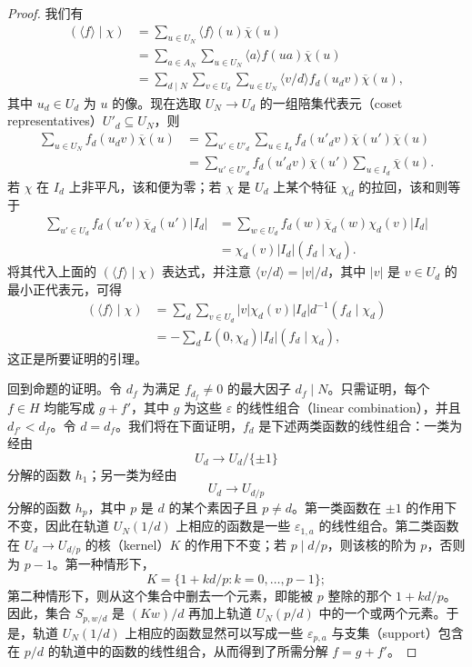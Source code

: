 \begin{proof}
我们有
\begin{align*}
 (\langle f\rangle\mid\chi)
 &=\sum_{u\in U_N}\langle f\rangle(u)\overline{\chi}(u)\\
 &=\sum_{a\in A_N}\sum_{u\in U_N}\langle a\rangle f(ua)\overline{\chi}(u)\\
 &=\sum_{d\mid N}\sum_{v\in U_d}\sum_{u\in U_N}
   \langle v/d\rangle f_d(u_dv)\overline{\chi}(u),
\end{align*}
其中 $u_d\in U_d$ 为 $u$ 的像。现在选取 $U_N\longrightarrow U_d$ 的一组陪集代表元（coset representatives）$U'_d\subseteq U_N$，则
\begin{align*}
 \sum_{u\in U_N}f_d(u_dv)\overline\chi(u)
 &=\sum_{u'\in U'_d}\sum_{u\in I_d}
       f_d(u'_dv)\overline\chi(u')\overline\chi(u)\\
 &=\sum_{u'\in U'_d}f_d(u'_dv)\overline\chi(u')
       \sum_{u\in I_d}\overline\chi(u).
\end{align*}
若 $\chi$ 在 $I_d$ 上非平凡，该和便为零；若 $\chi$ 是 $U_d$ 上某个特征 $\chi_d$ 的拉回，该和则等于
\begin{align*}
 \sum_{u'\in U_d}f_d(u'v)\overline\chi_d(u')|I_d|
 &=\sum_{w\in U_d}f_d(w)\overline\chi_d(w)\chi_d(v)|I_d|\\
 &=\chi_d(v)|I_d|(f_d\mid\chi_d).
\end{align*}
将其代入上面的 $(\langle f\rangle\mid\chi)$ 表达式，并注意
$\langle v/d\rangle=|v|/d$，其中 $|v|$ 是 $v\in U_d$ 的最小正代表元，可得
\begin{align*}
 (\langle f\rangle\mid\chi)
 &=\sum_d\sum_{v\in U_d}|v|\chi_d(v)|I_d|d^{-1}(f_d\mid\chi_d)\\
 &=-\sum_d L(0,\chi_d)|I_d|(f_d\mid\chi_d),
\end{align*}
这正是所要证明的引理。

回到命题的证明。令 $d_f$ 为满足 $f_{d_f}\ne0$ 的最大因子 $d_f\mid N$。只需证明，每个 $f\in H$ 均能写成 $g+f'$，其中 $g$ 为这些 $\varepsilon$ 的线性组合（linear combination），并且 $d_{f'}<d_f$。令 $d=d_f$。我们将在下面证明，$f_d$ 是下述两类函数的线性组合：一类为经由
\[
 U_d\longrightarrow U_d/\{\pm1\}
\]
分解的函数 $h_1$；另一类为经由
\[
 U_d\longrightarrow U_{d/p}
\]
分解的函数 $h_p$，其中 $p$ 是 $d$ 的某个素因子且 $p\ne d$。第一类函数在 $\pm1$ 的作用下不变，因此在轨道 $U_N(1/d)$ 上相应的函数是一些 $\varepsilon_{1,a}$ 的线性组合。第二类函数在 $U_d\longrightarrow U_{d/p}$ 的核（kernel）$K$ 的作用下不变；若 $p\mid d/p$，则该核的阶为 $p$，否则为 $p-1$。第一种情形下，
\[
 K=\{1+kd/p:k=0,\ldots,p-1\};
\]
第二种情形下，则从这个集合中删去一个元素，即能被 $p$ 整除的那个 $1+kd/p$。因此，集合 $S_{p,w/d}$ 是 $(Kw)/d$ 再加上轨道 $U_N(p/d)$ 中的一个或两个元素。于是，轨道 $U_N(1/d)$ 上相应的函数显然可以写成一些 $\varepsilon_{p,a}$ 与支集（support）包含在 $p/d$ 的轨道中的函数的线性组合，从而得到了所需分解 $f=g+f'$。


\end{proof}
